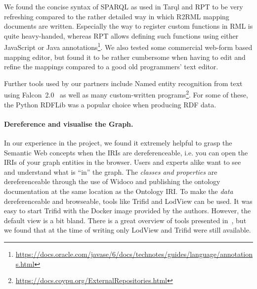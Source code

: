 \documentclass[
hf
]{ceurart}
\begin{document}

We found the concise syntax of SPARQL as used in Tarql and RPT to be very refreshing compared to the rather detailed way in which R2RML mapping documents are written. Especially the way to register custom functions in RML is quite heavy-handed, whereas RPT allows defining such functions using either JavaScript or Java annotations\footnote{\url{https://docs.oracle.com/javase/6/docs/technotes/guides/language/annotations.html}}. We also tested some commercial web-form based mapping editor, but found it to be rather cumbersome when having to edit and refine the mappings compared to a good old programmers' text editor. 

Further tools used by our partners include Named entity recognition from text using Falcon~2.0~\cite{falcon20} as well as many custom-written programs\footnote{\url{https://docs.coypu.org/ExternalRepositories.html}}. For some of these, the Python RDFLib was a popular choice when producing RDF data.

\paragraph{Dereference and visualise the Graph.}\label{para:visual}
In our experience in the \CoyPu project, we found it extremely helpful to grasp the Semantic Web concepts when the IRIs are dereferenceable, i.e. you can open the IRIs of your graph entities in the browser. Users and experts alike want to see and understand what is ``in'' the graph. The \emph{classes and properties} are dereferenceable through the use of Widoco and publishing the ontology documentation at the same location as the Ontology IRI. To make the \emph{data} dereferenceable and browseable, tools like Trifid and LodView can be used. It was easy to start Trifid with the Docker image provided by the authors. However, the default view is a bit bland. There is a great overview of tools presented in~\cite{regalia2017phuzzy}, but we found that at the time of writing only LodView and Trifid were still available.
\end{document}

